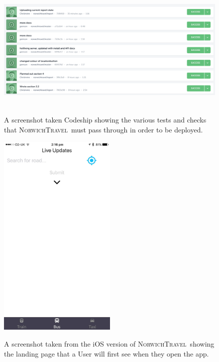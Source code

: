 \documentclass[cmpstyle]{ueacmpstyle}
\newcommand{\nt}{\textsc{NorwichTravel}}
\begin{document}
		\begin{figure}[h]
			\centering
			\includegraphics[height=6cm]{images/codeship.png}\\
			\caption{A screenshot taken Codeship showing the various tests and checks that \nt \ must pass through in order to be deployed.}\label{fig:codeship}
		\end{figure}
		\begin{figure}[h]
			\centering
			\includegraphics[height=10cm]{images/ios-landing.jpg}\\
			\caption{A screenshot taken from the iOS version of \nt \ showing the landing page that a User will first see when they open the app.}\label{fig:ios-landing}
		\end{figure}
\end{document}
